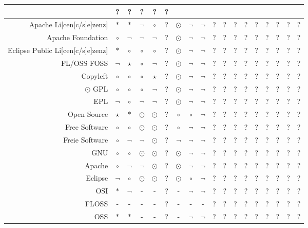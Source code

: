 \documentclass[
  DIV=calc,
  BCOR=5mm,
  11pt,
  headings=small,
  oneside,
  abstract=true,
  toc=bib,
  english,ngerman]{scrartcl}
\begin{document}
\begin{table}
\begin{center}
\begin{tabular}[h]{|r|c|c|c||c||c|c|c|c||c|c|c|c|c|c|c|c||c|}
  & ? & ? & ? & ? & ?\\
\hline
Apache Li[cen[c/s]e]zenz]
  & $\ast$ & $\ast$ & $\neg$ &  $\circ$ & ? & $\odot$
  & $\neg$ & $\neg$ & ? & ? & ? & ?
  & ? & ? & ? & ? & ?\\
\hline
Apache Foundation
  & $\circ$ & $\neg$ & $\neg$ & $\neg$ & ? & $\odot$
  & $\neg$ & $\neg$ & ? & ? & ? & ?
  & ? & ? & ? & ? & ?\\
\hline
Eclipse Public Li[cen[c/s]e]zenz]
  & $\ast$ & $\circ$ & $\circ$ & $\circ$ & ? & $\odot$
  & $\neg$ & $\neg$ & ? & ? & ? & ?
  & ? & ? & ? & ? & ?\\
\hline 
FL/OSS FOSS
  & $\neg$ & $\star$ & $\circ$ & $\neg$ & ? & $\odot$
  & $\neg$ & $\neg$ & ? & ? & ? & ?
  & ? & ? & ? & ? & ?\\
\hline
Copyleft
  & $\circ$ & $\circ$ & $\circ$ & $\star$ & ? & $\odot$
  & $\neg$ & $\neg$ & ? & ? & ? & ?
  & ? & ? & ? & ? & ?\\
\hline
\hline$\odot$
GPL
  & $\circ$ & $\circ$ & $\circ$ & $\neg$ & ? & $\odot$
  & $\neg$ & $\neg$ & ? & ? & ? & ?
  & ? & ? & ? & ? & ?\\
\hline
EPL
  & $\neg$ & $\circ$ & $\neg$ & $\neg$ & ? & $\odot$
  & $\neg$ & $\neg$ & ? & ? & ? & ?
  & ? & ? & ? & ? & ?\\
\hline 
\hline
Open Source
  & $\star$ & $\ast$ & $\odot$ & $\odot$ & ? & $\circ$ 
  & $\circ$ & $\neg$ & ? & ? & ? & ?
  & ? & ? & ? & ? & ?\\
\hline
Free Software
  & $\circ$ & $\circ$ & $\odot$ & $\odot$ & ? & $\circ$
  & $\neg$ & $\neg$ & ? & ? & ? & ?
  & ? & ? & ? & ? & ?\\
\hline
Freie Software
  & $\circ$ & $\neg$ & $\neg$ & $\odot$ & ? & $\neg$
  & $\neg$ & $\neg$ & ? & ? & ? & ?
  & ? & ? & ? & ? & ?\\
\hline
GNU
  & $\circ$ & $\circ$ & $\odot$ & $\odot$ & ? & $\odot$
  & $\neg$ & $\neg$ & ? & ? & ? & ?
  & ? & ? & ? & ? & ?\\
\hline
Apache
  & $\circ$ & $\neg$ & $\neg$ & $\odot$ & ? & $\odot$
  & $\neg$ & $\neg$ & ? & ? & ? & ?
  & ? & ? & ? & ? & ?\\
\hline
Eclipse
  & $\neg$ & $\circ$ & $\odot$ & $\odot$ & ? & $\odot$
  & $\circ$ & $\neg$ & ? & ? & ? & ?
  & ? & ? & ? & ? & ?\\
\hline
\hline
OSI
  & $\ast$ & $\neg$ & - & - & ? & -
  & $\neg$ & $\neg$ & ? & ? & ? & ?
  & ? & ? & ? & ? & ?\\
\hline
FLOSS
  & - & - & - & - & ? & -
  & - & - & ? & ? & ? & ?
  & ? & ? & ? & ? & ?\\
\hline
OSS
  & $\ast$ & $\ast$ & - & - & ? & -
  & $\neg$ & $\neg$ & ? & ? & ? & ?
  & ? & ? & ? & ? & ?\\
\hline

\end{tabular}
\end{center}
\end{table}
\end{document}

